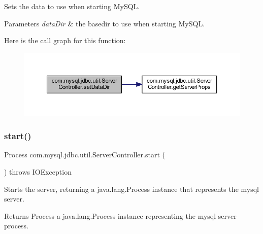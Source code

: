 Sets the data to use when starting My\+S\+QL.


\begin{DoxyParams}{Parameters}
{\em data\+Dir} & the basedir to use when starting My\+S\+QL. \\
\hline
\end{DoxyParams}
Here is the call graph for this function\+:
\nopagebreak
\begin{figure}[H]
\begin{center}
\leavevmode
\includegraphics[width=350pt]{classcom_1_1mysql_1_1jdbc_1_1util_1_1_server_controller_a722d9aabaa42a36226901125e1580e72_cgraph}
\end{center}
\end{figure}
\mbox{\label{classcom_1_1mysql_1_1jdbc_1_1util_1_1_server_controller_aa6f82711f8bfe6c99c5bb1e89d5dd55f}} 
\subsubsection{\texorpdfstring{start()}{start()}}
{\footnotesize\ttfamily Process com.\+mysql.\+jdbc.\+util.\+Server\+Controller.\+start (\begin{DoxyParamCaption}{ }\end{DoxyParamCaption}) throws I\+O\+Exception}

Starts the server, returning a java.\+lang.\+Process instance that represents the mysql server.

\begin{DoxyReturn}{Returns}
Process a java.\+lang.\+Process instance representing the mysql server process. 
\end{DoxyReturn}

